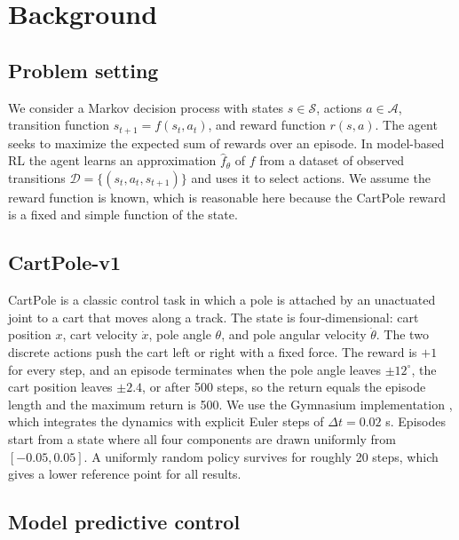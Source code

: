\documentclass{article}
\begin{document}
\section{Background}

\subsection{Problem setting}

We consider a Markov decision process with states $s \in \mathcal{S}$, actions $a \in \mathcal{A}$, transition function $s_{t+1} = f(s_t, a_t)$, and reward function $r(s, a)$. The agent seeks to maximize the expected sum of rewards over an episode. In model-based RL the agent learns an approximation $\hat{f}_\theta$ of $f$ from a dataset of observed transitions $\mathcal{D} = \{(s_t, a_t, s_{t+1})\}$ and uses it to select actions. We assume the reward function is known, which is reasonable here because the CartPole reward is a fixed and simple function of the state.

\subsection{CartPole-v1}
\label{sec:cartpole}

CartPole \citep{barto1983} is a classic control task in which a pole is attached by an unactuated joint to a cart that moves along a track. The state is four-dimensional: cart position $x$, cart velocity $\dot{x}$, pole angle $\theta$, and pole angular velocity $\dot{\theta}$. The two discrete actions push the cart left or right with a fixed force. The reward is $+1$ for every step, and an episode terminates when the pole angle leaves $\pm 12^\circ$, the cart position leaves $\pm 2.4$, or after 500 steps, so the return equals the episode length and the maximum return is 500. We use the Gymnasium implementation \citep{brockman2016, towers2024}, which integrates the dynamics with explicit Euler steps of $\Delta t = 0.02$ s. Episodes start from a state where all four components are drawn uniformly from $[-0.05, 0.05]$. A uniformly random policy survives for roughly 20 steps, which gives a lower reference point for all results.

\subsection{Model predictive control}
\end{document}
